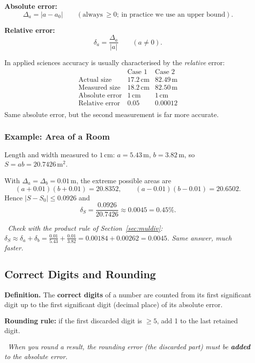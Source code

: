 \documentclass[hidelinks]{article}
\newcommand{\callout}[1]{\par\smallskip\noindent{\color{capri}$\blacktriangleright$}\ \textit{#1}\par\smallskip}
\newcommand{\abs}[1]{\left|#1\right|}
\begin{document}
\textbf{Absolute error:}
\[
\Delta_a=\abs{a-a_0}\qquad(\text{always}\ \ge 0;\ \text{in practice we use an upper bound}).
\]

\textbf{Relative error:}
\[
\delta_a=\frac{\Delta_a}{\abs{a}}\qquad(a\neq0).
\]

In applied sciences accuracy is usually characterised by the \emph{relative} error:
\[
\begin{array}{lcc}
 & \text{Case 1} & \text{Case 2}\\ \hline
\text{Actual size} & 17.2\,\text{cm} & 82.49\,\text{m}\\
\text{Measured size} & 18.2\,\text{cm} & 82.50\,\text{m}\\
\text{Absolute error} & 1\,\text{cm} & 1\,\text{cm}\\
\text{Relative error} & 0.05 & 0.00012\\
\end{array}
\]
Same absolute error, but the second measurement is far more accurate.

\subsubsection{Example: Area of a Room}

Length and width measured to $1$\,cm: $a=5.43$\,m, $b=3.82$\,m, so $S=ab=20.7426\,\text{m}^2$.

With $\Delta_a=\Delta_b=0.01$\,m, the extreme possible areas are
\[
(a+0.01)(b+0.01)=20.8352,\qquad (a-0.01)(b-0.01)=20.6502.
\]
Hence $\abs{S-S_0}\le0.0926$ and
\[
\delta_S=\frac{0.0926}{20.7426}\approx0.0045=0.45\%.
\]

\callout{Check with the product rule of Section~\ref{sec:muldiv}: $\delta_S\approx\delta_a+\delta_b=\tfrac{0.01}{5.43}+\tfrac{0.01}{3.82}=0.00184+0.00262=0.0045$. Same answer, much faster.}

\subsection{Correct Digits and Rounding}

\textbf{Definition.} The \textbf{correct digits} of a number are counted from its first significant digit up to the first significant digit (decimal place) of its absolute error.

\textbf{Rounding rule:} if the first discarded digit is $\ge5$, add 1 to the last retained digit.

\callout{When you round a result, the rounding error (the discarded part) must be \textbf{added} to the absolute error.}
\end{document}
